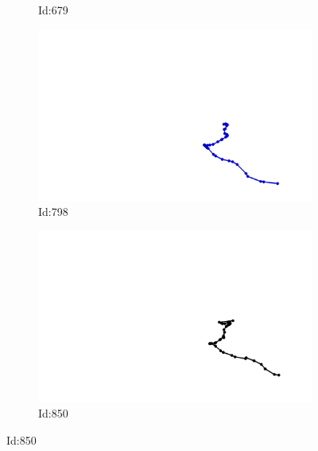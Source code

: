 \documentclass[12pt,twoside]{report}
\begin{document}
\begin{figure}
\begin{subfigure}[b]{0.20\textwidth}
\caption{Id:679}
\end{subfigure}
\begin{subfigure}[b]{0.20\textwidth}
\centering
\includegraphics[width=\textwidth]{../../trajectories/798.png}
\caption{Id:798}
\end{subfigure}
\begin{subfigure}[b]{0.20\textwidth}
\centering
\includegraphics[width=\textwidth]{../../trajectories/850.png}
\caption{Id:850}
\end{subfigure}
\end{figure}
\end{document}
